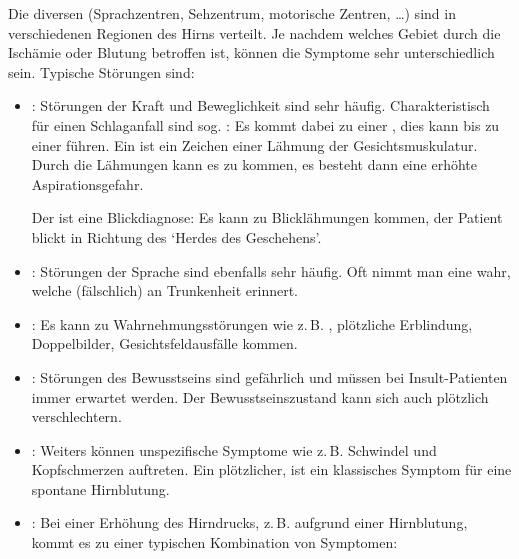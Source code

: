 {%
\label{topic:hirndruckzeichen}
Die diversen 
(Sprachzentren, Sehzentrum, motorische Zentren, \ldots)
sind in verschiedenen Regionen des Hirns verteilt. Je
nachdem welches Gebiet durch die Ischämie oder Blutung
betroffen ist, können die Symptome sehr unterschiedlich
sein.  Typische Störungen sind:

\begin{itemize}
  \item {}: Störungen der Kraft und Beweglichkeit
  sind sehr häufig.
  Charakteristisch für einen
  Schlaganfall sind sog. : Es kommt
  dabei zu einer , dies kann
  bis zu einer  führen. Ein
   ist ein Zeichen einer
  Lähmung der
  Gesichtsmuskulatur. Durch die Lähmungen kann es zu
   kommen, es besteht dann eine erhöhte
  Aspirationsgefahr.
  
  Der  ist eine Blickdiagnose: Es kann zu
  Blicklähmungen kommen, der Patient blickt in Richtung des
  \enquote*{Herdes des Geschehens}.
  
  \item {}: Störungen der Sprache sind ebenfalls
  sehr häufig. Oft nimmt man eine 
  wahr, welche (fälschlich) an Trunkenheit erinnert.
  
  \item {}:
  Es kann zu Wahrnehmungsstörungen wie z.\,B.
  , plötzliche Erblindung, Doppelbilder,
  Gesichtsfeldausfälle kommen.
  
  \item {}: Störungen des Bewusstseins sind
  gefährlich und müssen bei Insult-Patienten immer erwartet
  werden. Der Bewusstseinszustand kann sich auch plötzlich
  verschlechtern.
  
  \item {}: Weiters können unspezifische
  Symptome wie z.\,B. Schwindel und Kopfschmerzen auftreten. Ein
  plötzlicher,  ist ein
  klassisches Symptom für eine spontane Hirnblutung.
  
  \item {}: Bei einer Erhöhung des
  Hirndrucks, z.\,B. aufgrund einer Hirnblutung, kommt es zu
  einer typischen Kombination von Symptomen: 
  

\end{itemize}}
